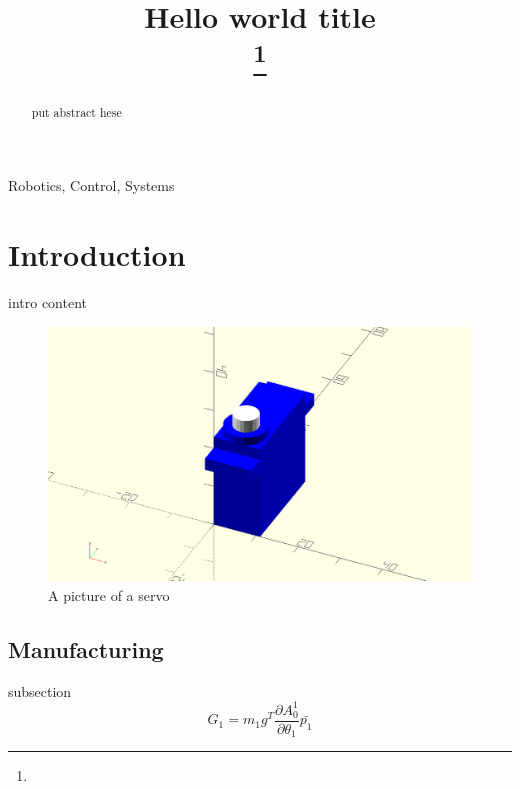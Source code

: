 \documentclass[conference]{IEEEtran}
\begin{document}
\title{Hello world title\\
{\footnotesize }
\thanks{}
}


\author{
}

\maketitle

\begin{abstract}
put abstract hese
\end{abstract}

\begin{IEEEkeywords}
Robotics, Control, Systems
\end{IEEEkeywords}

\section{Introduction}
intro content
	
	\begin{figure}[H]
		\centering
		 \includegraphics[width=0.75\linewidth]{./images/servo.png}
		 	\caption{A picture of a servo}
	\end{figure}	
	\subsection{Manufacturing}
		subsection
			\begin{equation}
			G_1 = m_1 g^T \frac{\partial A_0^1}{\partial \theta_1}\bar{p_1}
			\end{equation}
			
\end{document}
